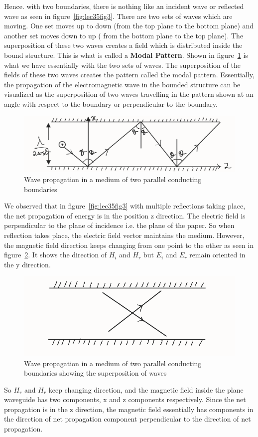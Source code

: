 Hence. with two boundaries, there is nothing like an incident wave or reflected wave as seen in figure~\ref{fig:lec35fig3}. There are two sets of waves which are moving. One set moves up to down (from the top plane to the bottom plane) and another set moves down to up ( from the bottom plane to the top plane). The superposition of these two waves creates a field which is distributed inside the bound structure. This is what is called a \textbf{Modal Pattern}. Shown in figure~\ref{fig:lec35fig4} is what we have essentially with the two sets of waves. The superposition of the fields of these two waves creates the pattern called the modal pattern. Essentially, the propagation of the electromagnetic wave in the bounded structure can be visualized as the superposition of two waves travelling in the pattern shown at an angle with respect to the boundary or perpendicular to the boundary.
\begin{figure}[h]
\centering
\includegraphics[width=1\linewidth]{./graphics/lec35fig4}
\caption{Wave propagation in a medium of two parallel conducting boundaries}
\label{fig:lec35fig4}
\end{figure}

We observed that in figure~\ref{fig:lec35fig3} with multiple reflections taking place, the net propagation of energy is in the position z direction. The electric field is perpendicular to the plane of incidence i.e. the plane of the paper. So when reflection takes place, the electric field vector maintains the medium. However, the magnetic field direction keeps changing from one point to the other as seen in figure~\ref{fig:lec35fig5}. It shows the direction of $H_i$ and $H_r$ but $E_i$ and $E_r$ remain oriented in the y direction.
\begin{figure}[h]
\centering
\includegraphics[width=1\linewidth]{./graphics/lec35fig5}
\caption{Wave propagation in a medium of two parallel conducting boundaries showing the superposition of waves}
\label{fig:lec35fig5}
\end{figure}
So $H_r$ and $H_r$ keep changing direction, and the magnetic field inside the plane waveguide has two components, x and z components respectively. Since the net propagation is in the z direction, the magnetic field essentially has components in the direction of net propagation component perpendicular to the direction of net propagation.

